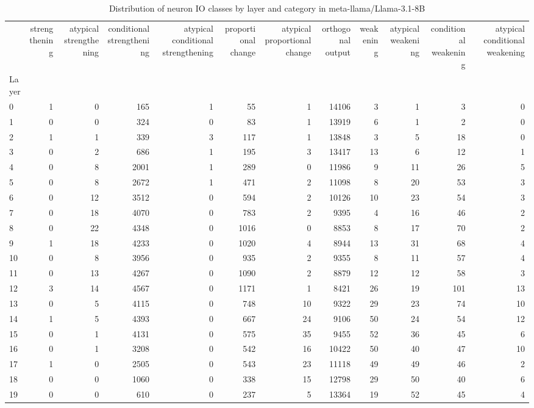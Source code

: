 \begin{table}
\caption{Distribution of neuron IO classes by layer and category in meta-llama/Llama-3.1-8B}
\label{tab:meta-llama/Llama-3.1-8B}
\begin{tabular}{lrrrrrrrrrrr}
 & strengthening & atypical strengthening & conditional strengthening & atypical conditional strengthening & proportional change & atypical proportional change & orthogonal output & weakening & atypical weakening & conditional weakening & atypical conditional weakening \\
Layer &  &  &  &  &  &  &  &  &  &  &  \\
0 & 1 & 0 & 165 & 1 & 55 & 1 & 14106 & 3 & 1 & 3 & 0 \\
1 & 0 & 0 & 324 & 0 & 83 & 1 & 13919 & 6 & 1 & 2 & 0 \\
2 & 1 & 1 & 339 & 3 & 117 & 1 & 13848 & 3 & 5 & 18 & 0 \\
3 & 0 & 2 & 686 & 1 & 195 & 3 & 13417 & 13 & 6 & 12 & 1 \\
4 & 0 & 8 & 2001 & 1 & 289 & 0 & 11986 & 9 & 11 & 26 & 5 \\
5 & 0 & 8 & 2672 & 1 & 471 & 2 & 11098 & 8 & 20 & 53 & 3 \\
6 & 0 & 12 & 3512 & 0 & 594 & 2 & 10126 & 10 & 23 & 54 & 3 \\
7 & 0 & 18 & 4070 & 0 & 783 & 2 & 9395 & 4 & 16 & 46 & 2 \\
8 & 0 & 22 & 4348 & 0 & 1016 & 0 & 8853 & 8 & 17 & 70 & 2 \\
9 & 1 & 18 & 4233 & 0 & 1020 & 4 & 8944 & 13 & 31 & 68 & 4 \\
10 & 0 & 8 & 3956 & 0 & 935 & 2 & 9355 & 8 & 11 & 57 & 4 \\
11 & 0 & 13 & 4267 & 0 & 1090 & 2 & 8879 & 12 & 12 & 58 & 3 \\
12 & 3 & 14 & 4567 & 0 & 1171 & 1 & 8421 & 26 & 19 & 101 & 13 \\
13 & 0 & 5 & 4115 & 0 & 748 & 10 & 9322 & 29 & 23 & 74 & 10 \\
14 & 1 & 5 & 4393 & 0 & 667 & 24 & 9106 & 50 & 24 & 54 & 12 \\
15 & 0 & 1 & 4131 & 0 & 575 & 35 & 9455 & 52 & 36 & 45 & 6 \\
16 & 0 & 1 & 3208 & 0 & 542 & 16 & 10422 & 50 & 40 & 47 & 10 \\
17 & 1 & 0 & 2505 & 0 & 543 & 23 & 11118 & 49 & 49 & 46 & 2 \\
18 & 0 & 0 & 1060 & 0 & 338 & 15 & 12798 & 29 & 50 & 40 & 6 \\
19 & 0 & 0 & 610 & 0 & 237 & 5 & 13364 & 19 & 52 & 45 & 4 \\

\end{tabular}
\end{table}

